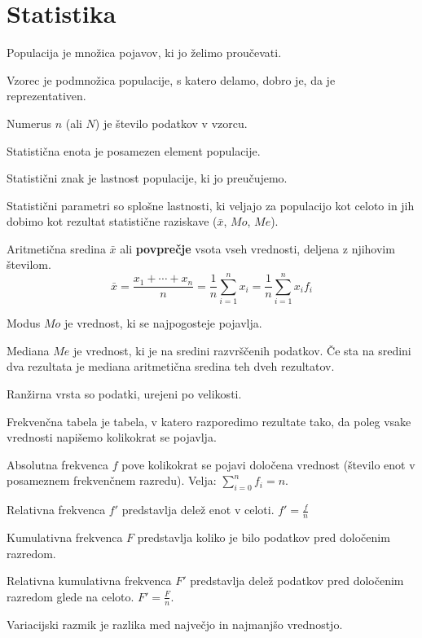 \documentclass[a4paper,oneside,12pt,fleqn]{article}
\numberwithin{equation}{section}
\newenvironment{description*}%
{
\vspace{-12pt}%
\begin{description}%
\setlength{\itemsep}{0pt}%
\setlength{\parskip}{2pt}}%
{\end{description}}
\begin{document}
\section{Statistika}
\label{sec:stat}
\begin{description*}
  \item[Populacija] je množica pojavov, ki jo želimo proučevati.
  \item[Vzorec] je podmnožica populacije, s katero delamo, dobro je, da je
    reprezentativen.
  \item[Numerus $n$] (ali $N$) je število podatkov v vzorcu.
  \item[Statistična enota] je posamezen element populacije.
  \item[Statistični znak] je lastnost populacije, ki jo preučujemo.
  \item[Statistični parametri] so splošne lastnosti, ki veljajo za populacijo kot celoto in jih
    dobimo kot rezultat statistične raziskave ($\bar{x}$, $Mo$, $Me$).
  \item[Aritmetična sredina] $\bar{x}$ ali \textbf{povprečje} vsota vseh vrednosti, deljena z
    njihovim številom.
    \[ \bar{x} = \frac{x_1 + \cdots + x_n}{n} = \frac{1}{n}\sum_{i=1}^nx_i  =
    \frac{1}{n}\sum_{i=1}^nx_if_i\]
  \item[Modus $Mo$] je vrednost, ki se najpogosteje pojavlja.
  \item[Mediana $Me$] je vrednost, ki je na sredini razvrščenih podatkov. Če sta na sredini dva
    rezultata je mediana aritmetična sredina teh dveh rezultatov.
  \item[Ranžirna vrsta] so podatki, urejeni po velikosti.
  \item[Frekvenčna tabela] je tabela, v katero razporedimo rezultate tako, da poleg vsake
    vrednosti napišemo kolikokrat se pojavlja.
  \item[Absolutna frekvenca $f$] pove kolikokrat se pojavi določena vrednost (število enot
    v posameznem frekvenčnem razredu). Velja: $\sum_{i=0}^nf_i = n.$
  \item[Relativna frekvenca $f'$] predstavlja delež enot v celoti. $f' = \frac{f}{n}$
  \item[Kumulativna frekvenca $F$] predstavlja koliko je bilo podatkov pred določenim
    razredom.
  \item[Relativna kumulativna frekvenca $F'$] predstavlja delež podatkov pred določenim
    razredom glede na celoto. $F' = \frac{F}{n}$.
  \item[Variacijski razmik] je razlika med največjo in najmanjšo vrednostjo.

\end{description*}
\end{document}
